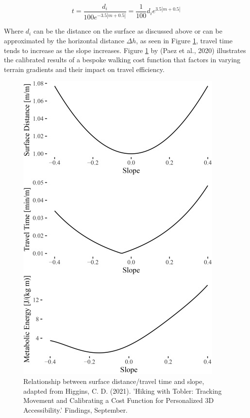 \documentclass[
11pt, %
oneside, %
english, %
singlespacing, %
]{macthesis} %
\begin{document}
\begin{equation}
t = \frac{d_i}{100 e^{-3.5 |m + 0.5|}} = \frac{1}{100} d_i e^{3.5 |m + 0.5|}
\label{eq:amount-of-speed}
\end{equation}

Where \(d_i\) can be the distance on the surface as discussed above or can be approximated by the horizontal distance \(\Delta h\), as seen in Figure \ref{fig:ch02-plot-fig-03}, travel time tends to increase as the slope increases. Figure \ref{fig:ch02-plot-fig-03} by (Paez et al., 2020) illustrates the calibrated results of a bespoke walking cost function that factors in varying terrain gradients and their impact on travel efficiency.

\begin{figure}

{\centering \includegraphics[width=1\linewidth]{figure/ch02-Fig-03} 

}

\caption{Relationship between surface distance/travel time and slope, adapted from Higgins, C. D. (2021). 'Hiking with Tobler: Tracking Movement and Calibrating a Cost Function for Personalized 3D Accessibility.' Findings, September.}\label{fig:ch02-plot-fig-03}
\end{figure}
\end{document}
